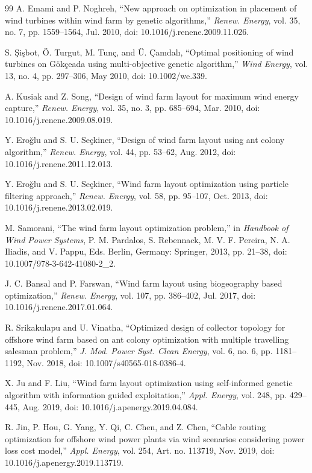\documentclass[journal,twoside]{IEEEtran}
\begin{document}
\begin{thebibliography}{99}
A. Emami and P. Noghreh, ``New approach on optimization in placement of wind turbines within wind farm by genetic algorithms,'' \textit{Renew. Energy}, vol. 35, no. 7, pp. 1559--1564, Jul. 2010, doi: 10.1016/j.renene.2009.11.026.

S. \c{S}i\c{s}bot, \"O. Turgut, M. Tun\c{c}, and \"U. \c{C}amdal\i, ``Optimal positioning of wind turbines on G\"ok\c{c}eada using multi-objective genetic algorithm,'' \textit{Wind Energy}, vol. 13, no. 4, pp. 297--306, May 2010, doi: 10.1002/we.339.

A. Kusiak and Z. Song, ``Design of wind farm layout for maximum wind energy capture,'' \textit{Renew. Energy}, vol. 35, no. 3, pp. 685--694, Mar. 2010, doi: 10.1016/j.renene.2009.08.019.

Y. Ero\u{g}lu and S. U. Se\c{c}kiner, ``Design of wind farm layout using ant colony algorithm,'' \textit{Renew. Energy}, vol. 44, pp. 53--62, Aug. 2012, doi: 10.1016/j.renene.2011.12.013.

Y. Ero\u{g}lu and S. U. Se\c{c}kiner, ``Wind farm layout optimization using particle filtering approach,'' \textit{Renew. Energy}, vol. 58, pp. 95--107, Oct. 2013, doi: 10.1016/j.renene.2013.02.019.

M. Samorani, ``The wind farm layout optimization problem,'' in \textit{Handbook of Wind Power Systems}, P. M. Pardalos, S. Rebennack, M. V. F. Pereira, N. A. Iliadis, and V. Pappu, Eds. Berlin, Germany: Springer, 2013, pp. 21--38, doi: 10.1007/978-3-642-41080-2\_2.

J. C. Bansal and P. Farswan, ``Wind farm layout using biogeography based optimization,'' \textit{Renew. Energy}, vol. 107, pp. 386--402, Jul. 2017, doi: 10.1016/j.renene.2017.01.064.

R. Srikakulapu and U. Vinatha, ``Optimized design of collector topology for offshore wind farm based on ant colony optimization with multiple travelling salesman problem,'' \textit{J. Mod. Power Syst. Clean Energy}, vol. 6, no. 6, pp. 1181--1192, Nov. 2018, doi: 10.1007/s40565-018-0386-4.

X. Ju and F. Liu, ``Wind farm layout optimization using self-informed genetic algorithm with information guided exploitation,'' \textit{Appl. Energy}, vol. 248, pp. 429--445, Aug. 2019, doi: 10.1016/j.apenergy.2019.04.084.

R. Jin, P. Hou, G. Yang, Y. Qi, C. Chen, and Z. Chen, ``Cable routing optimization for offshore wind power plants via wind scenarios considering power loss cost model,'' \textit{Appl. Energy}, vol. 254, Art. no. 113719, Nov. 2019, doi: 10.1016/j.apenergy.2019.113719.


\end{thebibliography}
\end{document}
